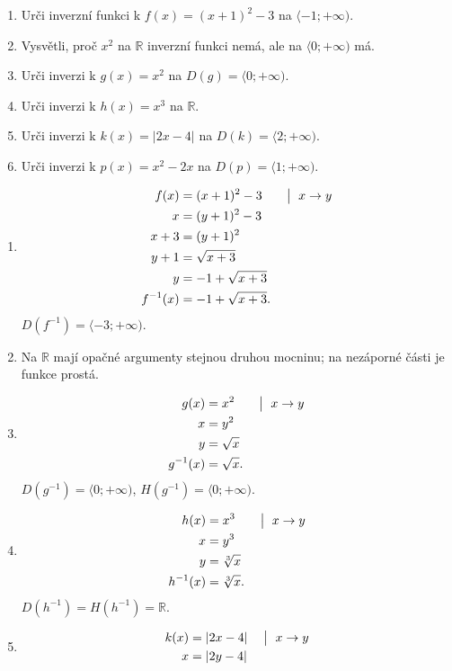 \documentclass[11pt,a4paper]{article}
\begin{document}
\begin{zadaniReseniBox}[title={Domácí úkol}]
\begin{enumerate}[label=\alph*)]
\item Urči inverzní funkci k $f(x)=(x+1)^2-3$ na $\langle-1;+\infty)$.
\item Vysvětli, proč $x^2$ na $\mathbb R$ inverzní funkci nemá, ale na $\langle0;+\infty)$ má.
\item Urči inverzi k $g(x)=x^2$ na $D(g)=\langle0;+\infty)$.
\item Urči inverzi k $h(x)=x^3$ na $\mathbb R$.
\item Urči inverzi k $k(x)=|2x-4|$ na $D(k)=\langle2;+\infty)$.
\item Urči inverzi k $p(x)=x^2-2x$ na $D(p)=\langle1;+\infty)$.
\end{enumerate}
\tcblower
\begin{enumerate}[label=\alph*)]
\item
\[
\begin{aligned}
f(x)&=(x+1)^2-3 &&\bigm|\ x\to y\\
x&=(y+1)^2-3\\
x+3&=(y+1)^2\\
y+1&=\sqrt{x+3}\\
y&=-1+\sqrt{x+3}\\
f^{-1}(x)&=-1+\sqrt{x+3}.
\end{aligned}
\]
$D(f^{-1})=\langle-3;+\infty)$.
\item Na $\mathbb R$ mají opačné argumenty stejnou druhou mocninu; na nezáporné části je funkce prostá.
\item
\[
\begin{aligned}
g(x)&=x^2 &&\bigm|\ x\to y\\
x&=y^2\\
y&=\sqrt{x}\\
g^{-1}(x)&=\sqrt{x}.
\end{aligned}
\]
$D(g^{-1})=\langle0;+\infty)$, $H(g^{-1})=\langle0;+\infty)$.
\item
\[
\begin{aligned}
h(x)&=x^3 &&\bigm|\ x\to y\\
x&=y^3\\
y&=\sqrt[3]{x}\\
h^{-1}(x)&=\sqrt[3]{x}.
\end{aligned}
\]
$D(h^{-1})=H(h^{-1})=\mathbb R$.
\item
\[
\begin{aligned}
k(x)&=|2x-4| &&\bigm|\ x\to y\\
x&=|2y-4|\\

\end{aligned}\]
\end{enumerate}
\end{zadaniReseniBox}
\end{document}
